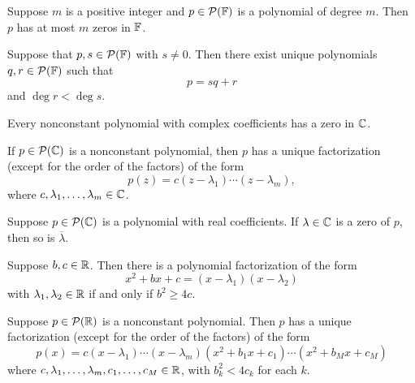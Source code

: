 \documentclass{extarticle}
\begin{document}
\begin{thm}
    Suppose \(m\) is a positive integer and \(p \in \mathcal{P}(\mathbb{F})\) is a polynomial of degree \(m\). 
    Then \(p\) has at most \(m\) zeros in \(\mathbb{F}\). 
\end{thm}

\begin{thm}
    Suppose that \(p, s \in \mathcal{P}(\mathbb{F})\) with \(s \neq 0\). Then there exist unique polynomials 
    \(q, r \in \mathcal{P}(\mathbb{F})\) such that 
    \[p = sq + r\]
    and \(\deg r < \deg s\). 
\end{thm}

\begin{thm}
    Every nonconstant polynomial with complex coefficients has a zero in \(\mathbb{C}\). 
\end{thm}

\begin{thm}
    If \(p \in \mathcal{P}(\mathbb{C})\) is a nonconstant polynomial, then \(p\) has a unique factorization 
    (except for the order of the factors) of the form 
    \[p(z) = c(z - \lambda_1) \cdots (z - \lambda_m),\]
    where \(c, \lambda_1, \ldots, \lambda_m \in \mathbb{C}\). 
\end{thm}

\begin{lemma}
    Suppose \(p \in \mathcal{P}(\mathbb{C})\) is a polynomial with real coefficients. If \(\lambda \in \mathbb{C}\)
    is a zero of \(p\), then so is \(\overline{\lambda}\). 
\end{lemma}

\begin{thm}
    Suppose \(b, c \in \mathbb{R}\). Then there is a polynomial factorization of the form 
    \[x^2 + bx + c = (x - \lambda_1)(x - \lambda_2)\]
    with \(\lambda_1, \lambda_2 \in \mathbb{R}\) if and only if \(b^2 \geq 4c\). 
\end{thm}


\begin{thm}
    Suppose \(p \in \mathcal{P}(\mathbb{R})\) is a nonconstant polynomial. Then \(p\) has a unique factorization 
    (except for the order of the factors) of the form 
    \[p(x) = c(x-\lambda_1)\cdots(x - \lambda_m)(x^2 + b_1x + c_1) \cdots(x^2 + b_M x + c_M)\]
    where \(c, \lambda_1, \ldots, \lambda_m, c_1, \ldots, c_M \in \mathbb{R}\), with 
    \(b_k^2 < 4 c_k\) for each \(k\). 
\end{thm}
\end{document}
